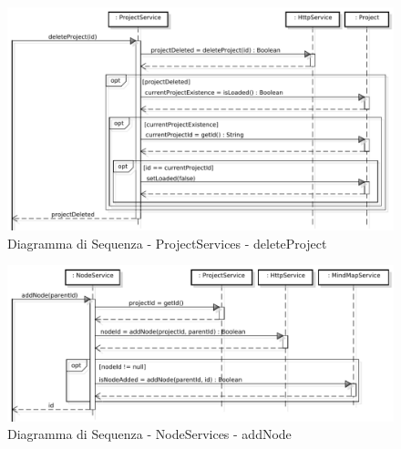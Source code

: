 \FloatBarrier
{}
\begin{center}
\begin{figure}[h]
\centering
\includegraphics[scale=0.33,keepaspectratio]{diagrammi/sequenza/FrontEnd/services/deleteProject.pdf}
\caption{Diagramma di Sequenza - ProjectServices - deleteProject}
\end{figure}
\end{center}
\FloatBarrier
{}
\begin{center}
\begin{figure}[h]
\centering
\includegraphics[scale=0.33,keepaspectratio]{diagrammi/sequenza/FrontEnd/services/addNode.pdf}
\caption{Diagramma di Sequenza - NodeServices - addNode}
\end{figure}
\end{center}
